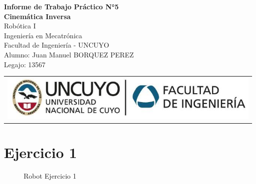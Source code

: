 \documentclass[a4paper,12pt]{article}
\begin{document}
\begin{titlepage}
    \centering
    \vspace*{5cm}
    {\Huge\bfseries Informe de Trabajo Práctico N°5}\\
    \vspace{0.2cm}
    {\Large \textbf{Cinemática Inversa}}\\
    \vspace{0.5cm}
    {\Large Robótica I}\\
    \vspace{0.5 cm}
    {\Large Ingeniería en Mecatrónica}\\
    \vspace{0.2 cm}
    {\Large Facultad de Ingeniería - UNCUYO}\\
    \vspace{1.5cm}
    Alumno: Juan Manuel BORQUEZ PEREZ\\
    Legajo: 13567\\
    \vfill
    {\begin{tabular}{@{}c@{}}\includegraphics[scale=0.4]{escudo.PNG}\end{tabular}}\hspace{10pt}
\end{titlepage}

\section{Ejercicio 1}
\begin{figure}[H]
    \centering
    \begin{adjustbox}{scale = 0.55, max width=\columnwidth}
    \end{adjustbox}
    \caption{Robot Ejercicio 1}
\end{figure}
\end{document}
